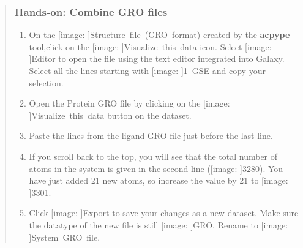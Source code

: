 \documentclass[twocolumn]{bmcart}%
\def\texttt{[image: ]}
\providecommand{\tightlist}{%
  \setlength{\itemsep}{0pt}\setlength{\parskip}{0pt}}
\begin{document}
\begin{quote}
\hypertarget{hands-on-combine-gro-files}{%
\subsubsection{Hands-on: Combine GRO
files}\label{hands-on-combine-gro-files}}

\begin{enumerate}
\def\labelenumi{\arabic{enumi}.}
\tightlist
\item
  On the \texttt{Structure\ file\ (GRO\ format)} created by the
  \textbf{acpype} tool,click on the \texttt{Visualize\ this\ data} icon.
  Select \texttt{Editor} to open the file using the text editor
  integrated into Galaxy. Select all the lines starting with
  \texttt{1\ GSE} and copy your selection.
\item
  Open the Protein GRO file by clicking on the
  \texttt{Visualize\ this\ data} button on the dataset.
\item
  Paste the lines from the ligand GRO file just before the last line.
\item
  If you scroll back to the top, you will see that the total number of
  atoms in the system is given in the second line (\texttt{3280}). You
  have just added 21 new atoms, so increase the value by 21 to
  \texttt{3301}.
\item
  Click \texttt{Export} to save your changes as a new dataset. Make sure
  the datatype of the new file is still \texttt{GRO}. Rename to
  \texttt{System\ GRO\ file}. 
\end{enumerate}
\end{quote}
\end{document}
